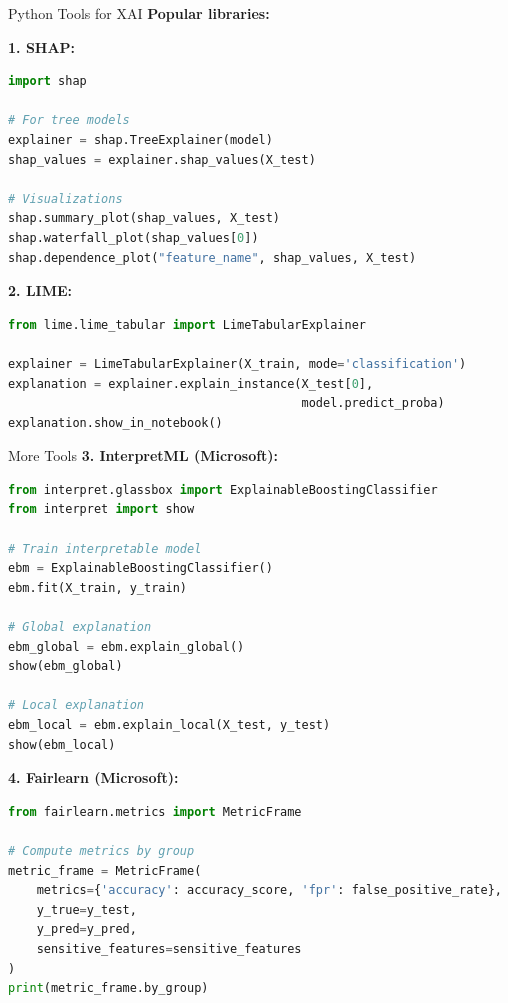 \documentclass[aspectratio=169]{beamer}
\begin{document}
\begin{frame}[fragile]{Python Tools for XAI}
  \textbf{Popular libraries:}

  \vspace{0.5em}

  \textbf{1. SHAP:}
  \begin{lstlisting}[language=Python]
import shap

# For tree models
explainer = shap.TreeExplainer(model)
shap_values = explainer.shap_values(X_test)

# Visualizations
shap.summary_plot(shap_values, X_test)
shap.waterfall_plot(shap_values[0])
shap.dependence_plot("feature_name", shap_values, X_test)
  \end{lstlisting}

  \vspace{0.5em}

  \textbf{2. LIME:}
  \begin{lstlisting}[language=Python]
from lime.lime_tabular import LimeTabularExplainer

explainer = LimeTabularExplainer(X_train, mode='classification')
explanation = explainer.explain_instance(X_test[0],
                                         model.predict_proba)
explanation.show_in_notebook()
  \end{lstlisting}
\end{frame}

\begin{frame}[fragile]{More Tools}
  \textbf{3. InterpretML (Microsoft):}
  \begin{lstlisting}[language=Python]
from interpret.glassbox import ExplainableBoostingClassifier
from interpret import show

# Train interpretable model
ebm = ExplainableBoostingClassifier()
ebm.fit(X_train, y_train)

# Global explanation
ebm_global = ebm.explain_global()
show(ebm_global)

# Local explanation
ebm_local = ebm.explain_local(X_test, y_test)
show(ebm_local)
  \end{lstlisting}

  \vspace{0.5em}

  \textbf{4. Fairlearn (Microsoft):}
  \begin{lstlisting}[language=Python]
from fairlearn.metrics import MetricFrame

# Compute metrics by group
metric_frame = MetricFrame(
    metrics={'accuracy': accuracy_score, 'fpr': false_positive_rate},
    y_true=y_test,
    y_pred=y_pred,
    sensitive_features=sensitive_features
)
print(metric_frame.by_group)
  \end{lstlisting}
\end{frame}
\end{document}

